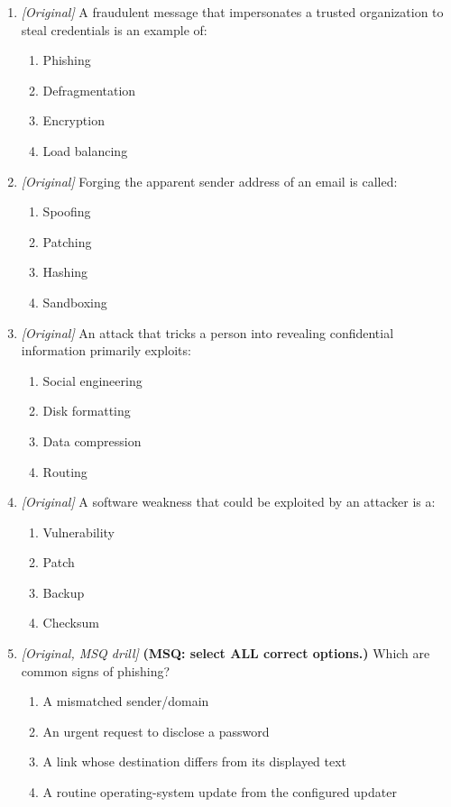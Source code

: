 \begin{enumerate}[label=\textbf{Q\arabic*.}, leftmargin=*]
\begin{enumerate}[label=\Alph*.]
    \item Spoofing hides the attacker's true identity.
    \item Strong unique passwords reduce account theft.
    \item Sharing OTPs with callers is safe practice.
  \end{enumerate}
\item \textit{[Original]} A fraudulent message that impersonates a trusted organization to steal credentials is an example of:
  \begin{enumerate}[label=\Alph*.]
\item Phishing
   \item Defragmentation
   \item Encryption
   \item Load balancing
  \end{enumerate}

\item \textit{[Original]} Forging the apparent sender address of an email is called:
  \begin{enumerate}[label=\Alph*.]
\item Spoofing
   \item Patching
   \item Hashing
   \item Sandboxing
  \end{enumerate}

\item \textit{[Original]} An attack that tricks a person into revealing confidential information primarily exploits:
  \begin{enumerate}[label=\Alph*.]
\item Social engineering
   \item Disk formatting
   \item Data compression
   \item Routing
  \end{enumerate}

\item \textit{[Original]} A software weakness that could be exploited by an attacker is a:
  \begin{enumerate}[label=\Alph*.]
\item Vulnerability
   \item Patch
   \item Backup
   \item Checksum
  \end{enumerate}

\item \textit{[Original, MSQ drill]} \textbf{(MSQ: select ALL correct options.)} Which are common signs of phishing?
  \begin{enumerate}[label=\Alph*.]
\item A mismatched sender/domain
   \item An urgent request to disclose a password
   \item A link whose destination differs from its displayed text
   \item A routine operating-system update from the configured updater
  \end{enumerate}


\end{enumerate}
